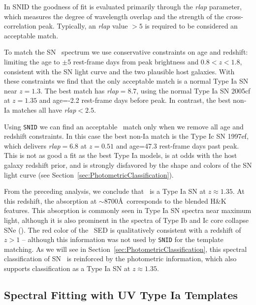 In SNID the goodness of fit is evaluated primarily through the {\it
rlap} parameter, which measures the degree of wavelength overlap and
the strength of the cross-correlation peak.  Typically, an {\it rlap}
value $>5$ is required to be considered an acceptable match.  

To match the SN \tomas\ spectrum we use conservative constraints on
age and redshift: limiting the age to $\pm$5 rest-frame days from peak
brightness and $0.8<z<1.8$, consistent with the SN light curve and
the two plausible host galaxies.  With these constraints we find that the only
acceptable match is a normal Type Ia SN near $z=1.3$. The best match
has {\it rlap}$=8.7$, using the normal Type Ia SN 2005cf at $z=1.35$
and age=-2.2 rest-frame days before peak.  In contrast, 
the best non-Ia matches all have {\it rlap}$<2.5$.

Using {\tt SNID} we can find an acceptable \CCSN\ match only
when we remove all age and redshift constraints. In this case the best
non-Ia match is the Type Ic SN 1997ef, which delivers {\it rlap}$=6.8$
at $z=0.51$ and age=47.3 rest-frame days past peak.  This is not as
good a fit as the best Type Ia models, is at odds with the host galaxy
redshift prior, and is strongly disfavored by the shape and colors of
the SN light curve (see Section~\ref{sec:PhotometricClassification}).  

From the preceding analysis, we conclude that \tomas\ is a Type Ia SN
at $z\approx1.35$.  At this redshift, the absorption at $\sim$8700\AA\
corresponds to the blended  H\&K features.
This \ion{Ca}{2} absorption is commonly seen in Type Ia SN spectra
near maximum light, although it is also prominent in the spectra of
Type Ib and Ic core collapse SNe (\CCSNe).  The red color of
the \tomas\ SED is qualitatively consistent with a redshift of $z>1$
-- although this information was not used by {\tt SNID} for the
template matching.  As we will see in Section~\ref{sec:PhotometricClassification},
this spectral classification of SN \tomas\ is reinforced by the
photometric information, which also supports classification as a Type
Ia SN at $z\approx1.35$.


\subsection{Spectral Fitting with UV Type Ia Templates}
\label{sec:SpecRedshift}

